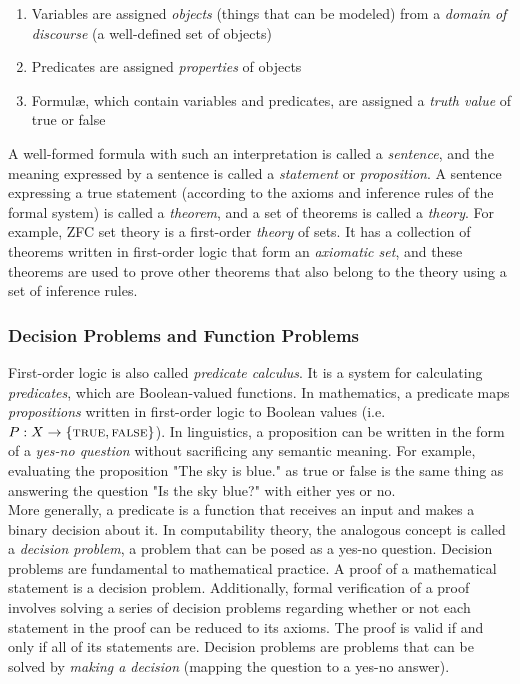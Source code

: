 \begin{enumerate}
	\item Variables are assigned \textit{objects} (things that can be modeled) from a \textit{domain of discourse} (a well-defined set of objects)
	\item Predicates are assigned \textit{properties} of objects
	\item Formul{\ae}, which contain variables and predicates, are assigned a \textit{truth value} of true or false
\end{enumerate}

A well-formed formula with such an interpretation is called a \textit{sentence}, and the meaning expressed by a sentence is called a \textit{statement} or \textit{proposition}. A sentence expressing a true statement (according to the axioms and inference rules of the formal system) is called a \textit{theorem}, and a set of theorems is called a \textit{theory}. For example, ZFC set theory is a first-order \textit{theory} of sets. It has a collection of theorems written in first-order logic that form an \textit{axiomatic set}, and these theorems are used to prove other theorems that also belong to the theory using a set of inference rules. \\

\subsubsection{Decision Problems and Function Problems}

First-order logic is also called \textit{predicate calculus}. It is a system for calculating \textit{predicates}, which are Boolean-valued functions. In mathematics, a predicate maps \textit{propositions} written in first-order logic to Boolean values (i.e. $P:X\rightarrow \{\textsc{true},\textsc{false}\}$). In linguistics, a proposition can be written in the form of a \textit{yes-no question} without sacrificing any semantic meaning. For example, evaluating the proposition "The sky is blue." as true or false is the same thing as answering the question "Is the sky blue?" with either yes or no. \\

More generally, a predicate is a function that receives an input and makes a binary decision about it. In computability theory, the analogous concept is called a \textit{decision problem}, a problem that can be posed as a yes-no question. Decision problems are fundamental to mathematical practice. A proof of a mathematical statement is a decision problem. Additionally, formal verification of a proof involves solving a series of decision problems regarding whether or not each statement in the proof can be reduced to its axioms. The proof is valid if and only if all of its statements are. Decision problems are problems that can be solved by \textit{making a decision} (mapping the question to a yes-no answer).  \\

